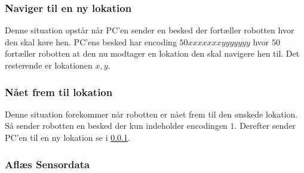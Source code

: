 \subsubsection{Naviger til en ny lokation}\label{design:protokol_navigertilny}
Denne situation opstår når PC'en sender en besked der fortæller robotten hvor den skal køre hen.
PC'ens besked har encoding $50xxxxxxxyyyyyyy$ hvor $50$ fortæller robotten at den nu modtager en lokation den skal navigere hen til.
Det resterende er lokationen $x,y$.

\subsubsection{Nået frem til lokation}
Denne situation forekommer når robotten er nået frem til den ønskede lokation.
Så sender robotten en besked der kun indeholder encodingen $1$.
Derefter sender PC'en til en ny lokation se i \cref{design:protokol_navigertilny}.

\subsubsection{Aflæs Sensordata}
